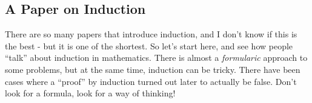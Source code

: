 \newpage
\subsection{A Paper on Induction}
There are so many papers that introduce induction, and I don't know if this is the best - but it is one of the shortest.  So let's start here, and see how people ``talk'' about induction in mathematics.  There is almost a  \emph{formularic} approach to some problems, but at the same time, induction can be tricky.  There have been cases where a ``proof'' by induction turned out later to actually be false.  Don't look for a formula, look for a way of thinking!\cite{gersting1975}
\fancyfoot[CE CO]{}
\fancyfoot[RE,RO]{}
\fancyfoot[LE,LO]{}

\begin{center}

%
\end{center}



